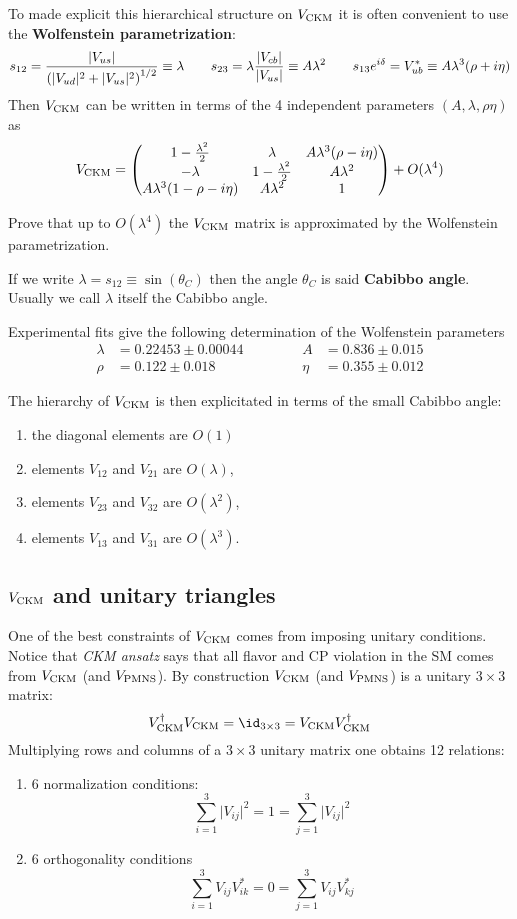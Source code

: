 \documentclass[TheoreticalPhy_ModB.tex]{subfiles}
\begin{document}
To made explicit this hierarchical structure on $V_{\text{CKM}}$ it is often convenient  to use the 
\textbf{Wolfenstein parametrization}:
\[s_{12}=\frac{\vert V_{us}\vert}{\left(\vert V_{ud}\vert^2+\vert V_{us}\vert^2\right)^{1/2}}\equiv\lambda
\qquad
s_{23}=\lambda\frac{\vert V_{cb}\vert}{\vert V_{us}\vert}\equiv A\lambda^2
\qquad
s_{13}e^{i\delta}= V_{ub}^*\equiv A\lambda^3(\rho+i\eta)\]
Then $V_{\text{CKM}}$ can be written in terms of the 4 independent parameters $(A,\lambda,\rho\eta)$ as
\[V_{\text{CKM}}=\begin{pmatrix}1-\frac{\lambda^2}2&\lambda&A\lambda^3(\rho-i\eta)\\
-\lambda&1-\frac{\lambda^2}2&A\lambda^2\\
A\lambda^3(1-\rho-i\eta)&A\lambda^2&1\end{pmatrix}+O(\lambda^4)\]

\begin{exercise} 
Prove that up to $O(\lambda^4)$ the $V_{\text{CKM}}$ matrix is approximated by the Wolfenstein parametrization.
\end{exercise}

If we write $\lambda=s_{12}\equiv\sin(\theta_C)$ then the angle $\theta_C$ is said \textbf{Cabibbo angle}. Usually we call $\lambda$ itself the Cabibbo angle.

Experimental fits give the following determination of the Wolfenstein parameters
\[\begin{aligned}
\lambda&=0.22453\pm0.00044 &&\quad&&A&=0.836\pm0.015\\
\rho&=0.122\pm0.018&&\quad&&\eta&=0.355\pm0.012\end{aligned}\]

The hierarchy of $V_{\text{CKM}}$ is then explicitated in terms of the small Cabibbo angle:
\begin{enumerate}
	\item the diagonal elements are $O(1)$
	\item elements $V_{12}$ and $V_{21}$ are $O(\lambda)$,
	\item elements $V_{23}$ and $V_{32}$ are $O(\lambda^2)$,
	\item elements $V_{13}$ and $V_{31}$ are $O(\lambda^3)$.
\end{enumerate}

\subsection{$V_{\text{CKM}}$ and unitary triangles}

One of the best constraints of $V_{\text{CKM}}$ comes from imposing unitary conditions. Notice that \emph{CKM ansatz} says that all flavor and CP violation in the SM comes from $V_{\text{CKM}}$ (and $V_{\text{PMNS}}$). By construction $V_{\text{CKM}}$ (and $V_{\text{PMNS}}$) is a  unitary $3\times3$ matrix:
\[\ckm^\dagger\ckm=\id_{3\times3}=\ckm\ckm^\dagger\]
Multiplying rows and columns of a $3\times3$ unitary matrix one obtains 12 relations:
\begin{enumerate}
	\item 6 normalization conditions:
	\[\sum_{i=1}^3\vert V_{ij}\vert^2=1=\sum_{j=1}^3\vert V_{ij}\vert^2\]
	\item 6 orthogonality conditions
	\[\sum_{i=1}^3V_{ij}V_{ik}^*=0=\sum_{j=1}^3V_{ij}V_{kj}^*\]
\end{enumerate}
\end{document}
